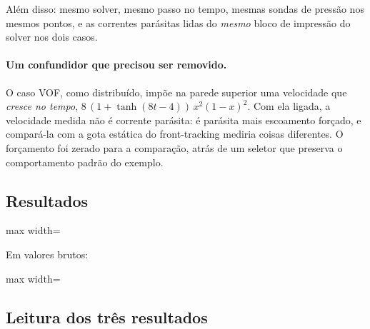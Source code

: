 Al\'em disso: mesmo solver, mesmo passo no tempo, mesmas sondas de press\~ao nos
mesmos pontos, e as correntes par\'asitas lidas do \emph{mesmo} bloco de
impress\~ao do solver nos dois casos.

\paragraph{Um confundidor que precisou ser removido.} O caso VOF, como
distribu\'ido, imp\~oe na parede superior uma velocidade que \emph{cresce no
tempo}, $8\,(1+\tanh(8t-4))\,x^{2}(1-x)^{2}$. Com ela ligada, a velocidade medida
n\~ao \'e corrente par\'asita: \'e par\'asita mais escoamento for\c{c}ado, e
compar\'a-la com a gota est\'atica do front-tracking mediria coisas diferentes.
O for\c{c}amento foi zerado para a compara\c{c}\~ao, atr\'as de um seletor que
preserva o comportamento padr\~ao do exemplo.

\subsection{Resultados}

\begin{adjustbox}{max width=\linewidth}
\end{adjustbox}

Em valores brutos:

\begin{adjustbox}{max width=\linewidth}
\end{adjustbox}

\subsection{Leitura dos tr\^es resultados}

